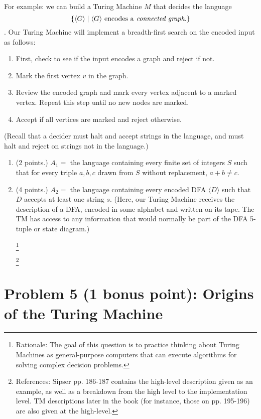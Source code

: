 \documentclass[letterpaper,11pt,twoside]{article}
\theoremstyle{plain}
\theoremstyle{definition}
\theoremstyle{remark}
\theoremstyle{restate}
\newcommand\blfootnote[1]{%
  \begingroup
  \renewcommand\thefootnote{}\footnote{#1}%
  \addtocounter{footnote}{-1}%
  \endgroup
}
\begin{document}
For example: we can build a Turing Machine $M$ that decides the language 
\[
    \{\langle G\rangle \; | \; \langle G \rangle \text{ encodes a\emph{ connected graph}.}\}
\].
Our Turing Machine will implement a breadth-first search on the encoded input as follows:
\begin{enumerate}
    \item First, check to see if the input encodes a graph and reject if not.
    \item Mark the first vertex $v$ in the graph.
    \item Review the encoded graph and mark every vertex adjacent to a marked vertex. Repeat this step until no new nodes are marked.
    \item Accept if all vertices are marked and reject otherwise.
\end{enumerate}

(Recall that a decider must halt and accept strings in the language, and must halt and reject on strings not in the language.)

\begin{enumerate}
    \item (2 points.) $A_1 = $ the language containing every finite set of integers $S$ such that for every triple $a, b, c$ drawn from $S$ without replacement, $a + b \neq c$.
    
    \item (4 points.) $A_2 = $ the language containing every encoded DFA $\langle D \rangle$ such that $D$ accepts at least one string $s$. (Here, our Turing Machine receives the description of a DFA, encoded in some alphabet and written on its tape. The TM has access to any information that would normally be part of the DFA 5-tuple or state diagram.)
    
    \blfootnote{ Rationale: The goal of this question is to practice thinking about Turing Machines as general-purpose computers that can execute algorithms for solving complex decision problems. }
    \blfootnote{ References: Sipser pp. 186-187 contains the high-level description given as an example, as well as a breakdown from the high level to the implementation level. TM descriptions later in the book (for instance, those on pp. 195-196) are also given at the high-level. }
\end{enumerate}



\clearpage
\section*{Problem 5 (1 bonus point): Origins of the Turing Machine}
\end{document}

